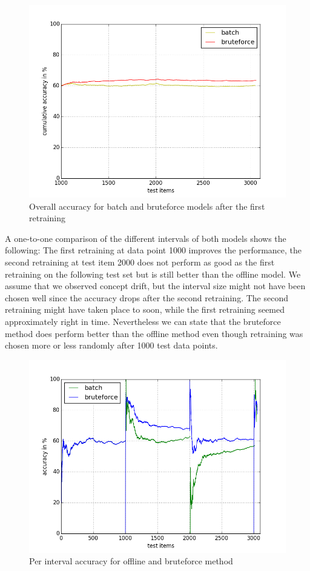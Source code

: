 \documentclass{article} %
\begin{document}
\begin{figure}[htbp]
  \centering
  \includegraphics[scale=0.5]{./plots/overallBatchBruteforce.png}
  \caption{Overall accuracy for batch and bruteforce models after the first retraining}
\end{figure}
A one-to-one comparison of the different intervals of both models shows the following: The first retraining at data point 1000 improves the performance, the second retraining at test item 2000 does not perform as good as the first retraining on the following test set but is still better than the offline model. We assume that we observed concept drift, but the interval size might not have been chosen well since the accuracy drops after the second retraining. The second retraining might have taken place to soon, while the first retraining seemed approximately right in time. Nevertheless we can state that the bruteforce method does  perform better than the offline method even though retraining was chosen more or less randomly after 1000 test data points.

\begin{figure}[htbp]
  \centering
  \includegraphics[scale=0.5]{./plots/bruteforce_batch.png}
  \caption{Per interval accuracy for offline and bruteforce method}
\end{figure}
\end{document}
